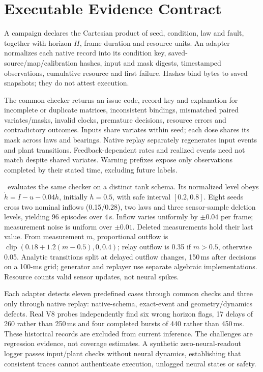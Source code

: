 \section{Executable Evidence Contract}
A campaign declares the Cartesian product of seed, condition, law and fault, together with horizon $H$, frame duration and resource units. An adapter normalizes each native record into its condition key, saved-source/map/calibration hashes, input and mask digests, timestamped observations, cumulative resource and first failure. Hashes bind bytes to saved snapshots; they do not attest execution.

The common checker returns an issue code, record key and explanation for incomplete or duplicate matrices, inconsistent bindings, mismatched paired variates/masks, invalid clocks, premature decisions, resource errors and contradictory outcomes. Inputs share variates within seed; each dose shares its mask across laws and bearings. Native replay separately regenerates input events and plant transitions. Feedback-dependent rates and realized events need not match despite shared variates. Warning prefixes expose only observations completed by their stated time, excluding future labels.

\reuseRef\ evaluates the same checker on a distinct tank schema. Its normalized level obeys $\dot h=I-u-0.04h$, initially $h=0.5$, with safe interval $[0.2,0.8]$. Eight seeds cross two nominal inflows (0.15/0.28), two laws and three sensor-sample deletion levels, yielding 96 episodes over 4\,s. Inflow varies uniformly by $\pm0.04$ per frame; measurement noise is uniform over $\pm0.01$. Deleted measurements hold their last value. From measurement $m$, proportional outflow is $\operatorname{clip}(0.18+1.2(m-0.5),0,0.4)$; relay outflow is 0.35 if $m>0.5$, otherwise 0.05. Analytic transitions split at delayed outflow changes, 150\,ms after decisions on a 100-ms grid; generator and replayer use separate algebraic implementations. Resource counts valid sensor updates, not neural spikes.

Each adapter detects eleven predefined cases through common checks and three only through native replay: native-schema, exact-event and geometry/dynamics defects. Real V8 probes independently find six wrong horizon flags, 17 delays of 260 rather than 250\,ms and four completed bursts of 440 rather than 450\,ms. These historical records are excluded from current inference. The challenges are regression evidence, not coverage estimates. A synthetic zero-neural-readout logger passes input/plant checks without neural dynamics, establishing that consistent traces cannot authenticate execution, unlogged neural states or safety.
